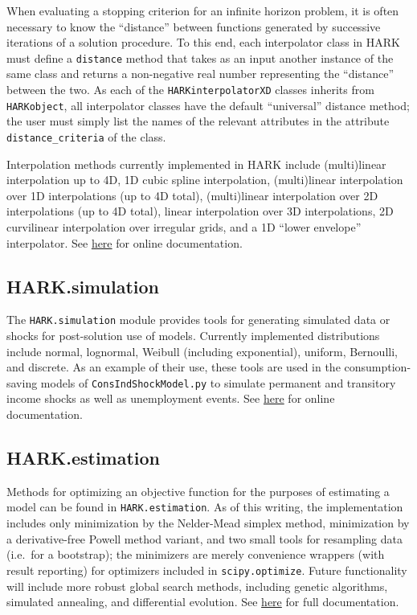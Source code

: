 \documentclass[12pt,titlepage,letterpaper]{econtex}
\begin{document}
{When evaluating a stopping criterion for an infinite horizon problem, it is often necessary to know the ``distance'' between functions generated by successive iterations of a solution procedure.  To this end, each interpolator class in HARK must define a \texttt{distance} method that takes as an input another instance of the same class and returns a non-negative real number representing the ``distance'' between the two.  As each of the \texttt{HARKinterpolatorXD} classes inherits from \texttt{HARKobject}, all interpolator classes have the default ``universal'' distance method; the user must simply list the names of the relevant attributes in the attribute \texttt{distance\_criteria} of the class.

Interpolation methods currently implemented in HARK include (multi)linear interpolation up to 4D, 1D cubic spline interpolation, (multi)linear interpolation over 1D interpolations (up to 4D total), (multi)linear interpolation over 2D interpolations (up to 4D total), linear interpolation over 3D interpolations, 2D curvilinear interpolation over irregular grids, and a 1D ``lower envelope'' interpolator.  See \href{https://hark.readthedocs.io/en/latest/generated/HARK.interpolation.html}{here} for online documentation.

\subsection{HARK.simulation}\label{sec:HARKsimulation}

The \texttt{HARK.simulation} module provides tools for generating simulated data or shocks for post-solution use of models.  Currently implemented distributions include normal, lognormal, Weibull (including exponential), uniform, Bernoulli, and discrete.  As an example of their use, these tools are used in the consumption-saving models of \texttt{ConsIndShockModel.py} to simulate permanent and transitory income shocks as well as unemployment events.  See \href{https://hark.readthedocs.io/en/latest/generated/HARK.simulation.html}{here} for online documentation.

\subsection{HARK.estimation}\label{sec:HARKestimation}

Methods for optimizing an objective function for the purposes of estimating a model can be found in \texttt{HARK.estimation}.  As of this writing, the implementation includes only minimization by the Nelder-Mead simplex method, minimization by a derivative-free Powell method variant, and two small tools for resampling data (i.e.\ for a bootstrap); the minimizers are merely convenience wrappers (with result reporting) for optimizers included in \texttt{scipy.optimize}.  Future functionality will include more robust global search methods, including genetic algorithms, simulated annealing, and differential evolution.  See \href{https://hark.readthedocs.io/en/latest/generated/HARK.estimation.html}{here} for full documentation.

}
\end{document}
